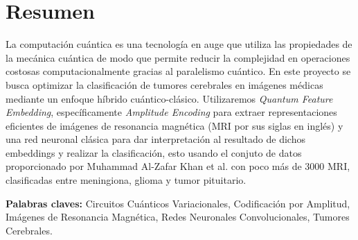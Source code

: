 \chapter*{Resumen}
    La computación cuántica es una tecnología en auge que utiliza las propiedades de la mecánica cuántica de modo que permite reducir la complejidad en operaciones costosas computacionalmente gracias al paralelismo cuántico. En este proyecto se busca optimizar la clasificación de tumores cerebrales en imágenes médicas mediante un enfoque híbrido cuántico-clásico. Utilizaremos \textit{Quantum Feature Embedding}, específicamente \textit{Amplitude Encoding} para extraer representaciones eficientes de imágenes de resonancia magnética (MRI por sus siglas en inglés) y una red neuronal clásica para dar interpretación al resultado de dichos embeddings y realizar la clasificación, esto usando el conjuto de datos proporcionado por Muhammad Al-Zafar Khan et al. \cite{khan2024brain} con poco más de 3000 MRI, clasificadas entre meningiona, glioma y tumor pituitario.
    
    \textbf{Palabras claves:} Circuitos Cuánticos Variacionales, Codificación por Amplitud, Imágenes de Resonancia Magnética, Redes Neuronales Convolucionales, Tumores Cerebrales.
\newpage